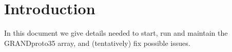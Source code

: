 \section{Introduction} 
In this document we give details needed to start, run and maintain the GRANDproto35 array, and (tentatively) fix possible issues.
